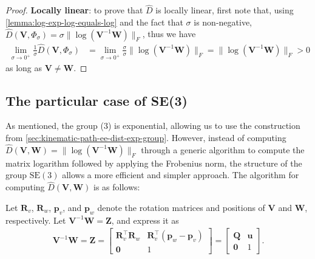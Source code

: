 \begin{proof}
    \textbf{Locally linear}: to prove that $\widehat{D}$ is locally linear, first note that, using \cref{lemma:log-exp-log-equals-log} and the fact that $\sigma$ is non-negative, $\widehat{D}(\mathbf{V}, \Phi_\sigma) = \sigma\|\log{\left(\mathbf{V}^{-1}\mathbf{W}\right)}\|_F$, thus we have
    \begin{align}
            \lim_{\sigma\to0^+}\frac{1}{\sigma}\widehat{D}(\mathbf{V}, \Phi_\sigma) &= \lim_{\sigma\to0^+}\frac{\sigma}{\sigma}\|\log{(\mathbf{V}^{-1}\mathbf{W})}\|_F
            = \|\log{(\mathbf{V}^{-1}\mathbf{W})}\|_F > 0
    \end{align}
    as long as $\mathbf{V} \not= \mathbf{W}$.
\end{proof}

\subsection{The particular case of SE(3)}\label{sec:explicit-construction-SE3}
As mentioned, the group (3) is exponential, allowing us to use the construction from \cref{sec:kinematic-path-ee-dist-exp-group}. However, instead of computing $\widehat{D}(\mathbf{V},\mathbf{W}) = \|\log(\mathbf{V}^{-1}\mathbf{W})\|_F$ through a generic algorithm to compute the matrix logarithm followed by applying the Frobenius norm, the structure of the group $\text{SE}(3)$ allows a more efficient and simpler approach. The algorithm for computing $\widehat{D}(\mathbf{V},\mathbf{W})$ is as follows:

Let $\mathbf{R}_v$, $\mathbf{R}_w$, $\mathbf{p}_v$, and $\mathbf{p}_w$ denote the rotation matrices and positions of $\mathbf{V}$ and $\mathbf{W}$, respectively. Let $\mathbf{V}^{-1}\mathbf{W} = \mathbf{Z}$, and express it as 
\begin{align*}
    \mathbf{V}^{-1}\mathbf{W} = \mathbf{Z} =\begin{bmatrix}
        \mathbf{R}_v^\top\mathbf{R}_w & \mathbf{R}_v^\top(\mathbf{p}_w - \mathbf{p}_v) \\
        \mathbf{0} & 1
    \end{bmatrix}
    = \begin{bmatrix}
        \mathbf{Q} & \mathbf{u} \\
        \mathbf{0} & 1
    \end{bmatrix}.
\end{align*}

